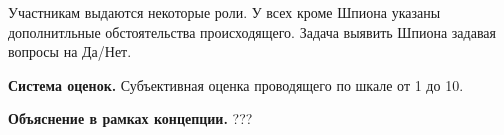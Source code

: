 
\par Участникам выдаются некоторые роли. У всех кроме Шпиона указаны дополнитльные обстоятельства происходящего. Задача выявить Шпиона задавая вопросы на Да/Нет.

\par \textbf{Система оценок.} Субъективная оценка проводящего по шкале от 1 до 10.

\par \textbf{Объяснение в рамках концепции.} ???